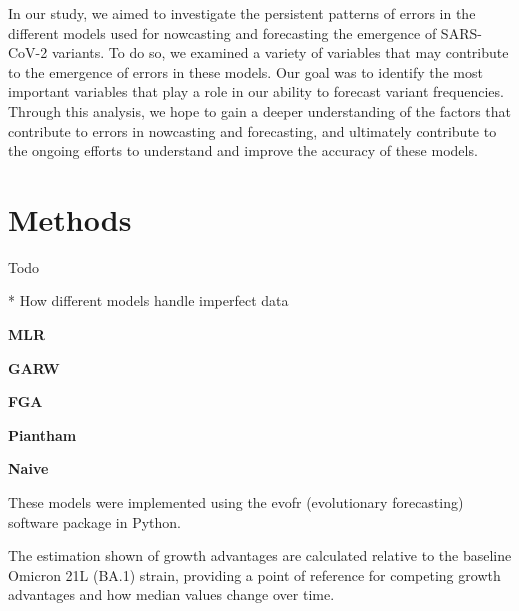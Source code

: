 \documentclass[11pt,oneside,letterpaper]{article}
\begin{document}
In our study, we aimed to investigate the persistent patterns of errors in the different models used for nowcasting and forecasting the emergence of SARS-CoV-2 variants. 
To do so, we examined a variety of variables that may contribute to the emergence of errors in these models. 
Our goal was to identify the most important variables that play a role in our ability to forecast variant frequencies.
Through this analysis, we hope to gain a deeper understanding of the factors that contribute to errors in nowcasting and forecasting, and ultimately contribute to the ongoing efforts to understand and improve the accuracy of these models.



























\section*{Methods}

Todo



* How different models handle imperfect data

\textbf{MLR}

\textbf{GARW}

\textbf{FGA}

\textbf{Piantham}

\textbf{Naive}


These models were implemented using the evofr (evolutionary forecasting) software package in Python.





The estimation shown of growth advantages are calculated relative to the baseline Omicron 21L (BA.1) strain, providing a point of reference for competing growth advantages and how median values change over time. 
\end{document}
